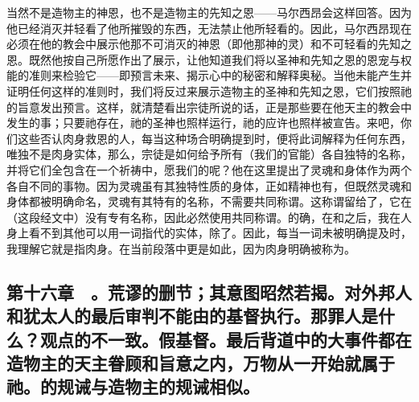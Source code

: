 当然不是造物主的神恩，也不是造物主的先知之恩——马尔西昂会这样回答。因为他已经消灭并轻看了他所摧毁的东西，无法禁止他所轻看的。因此，马尔西昂现在必须在他的教会中展示他那不可消灭的神恩（即他那神的灵）和不可轻看的先知之恩。既然他按自己所愿作出了展示，让他知道我们将以圣神和先知之恩的恩宠与权能的准则来检验它——即预言未来、揭示心中的秘密和解释奥秘。当他未能产生并证明任何这样的准则时，我们将反过来展示造物主的圣神和先知之恩，它们按照祂的旨意发出预言。这样，就清楚看出宗徒所说的话，正是那些要在他天主的教会中发生的事；只要祂存在，祂的圣神也照样运行，祂的应许也照样被宣告。来吧，你们这些否认肉身救恩的人，每当这种场合明确提到时，便将此词解释为任何东西，唯独不是肉身实体，那么，宗徒是如何给予所有（我们的官能）各自独特的名称，并将它们全包含在一个祈祷中，愿我们的呢？他在这里提出了灵魂和身体作为两个各自不同的事物。因为灵魂虽有其独特性质的身体，正如精神也有，但既然灵魂和身体都被明确命名，灵魂有其特有的名称，不需要共同称谓。这称谓留给了，它在（这段经文中）没有专有名称，因此必然使用共同称谓。的确，在和之后，我在人身上看不到其他可以用一词指代的实体，除了。因此，每当一词未被明确提及时，我理解它就是指肉身。在当前段落中更是如此，因为肉身明确被称为。\par


\subsection{第十六章　。荒谬的删节；其意图昭然若揭。对外邦人和犹太人的最后审判不能由的基督执行。那罪人是什么？观点的不一致。假基督。最后背道中的大事件都在造物主的天主眷顾和旨意之内，万物从一开始就属于祂。的规诫与造物主的规诫相似。}

